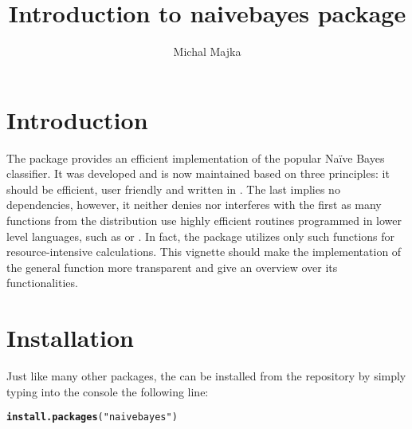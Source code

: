 \documentclass{article}\usepackage[]{graphicx}\usepackage[]{color}
\makeatletter
\newcommand{\hlstr}[1]{\textcolor[rgb]{0.192,0.494,0.8}{#1}}%
\newcommand{\hlstd}[1]{\textcolor[rgb]{0.345,0.345,0.345}{#1}}%
\newcommand{\hlkwd}[1]{\textcolor[rgb]{0.737,0.353,0.396}{\textbf{#1}}}%
\newenvironment{kframe}{%
 \def\at@end@of@kframe{}%
 \ifinner\ifhmode%
  \def\at@end@of@kframe{\end{minipage}}%
  \begin{minipage}{\columnwidth}%
 \fi\fi%
 \def\FrameCommand##1{\hskip\@totalleftmargin \hskip-\fboxsep
 \colorbox{shadecolor}{##1}\hskip-\fboxsep
     \hskip-\linewidth \hskip-\@totalleftmargin \hskip\columnwidth}%
 \MakeFramed {\advance\hsize-\width
   \@totalleftmargin\z@ \linewidth\hsize
   \@setminipage}}%
 {\par\unskip\endMakeFramed%
 \at@end@of@kframe}
\newenvironment{knitrout}{}{} %
\makeatother
\begin{document}
\title{Introduction to naivebayes package}

\author{Michal Majka}

\onehalfspace



\maketitle

\section{Introduction}

The \textcolor{darkgreen}{{}} package provides an efficient implementation of the popular Na\"ive Bayes classifier. It was developed and is now maintained based on three principles: it should be efficient, user friendly and written in \textcolor{darkgreen}{{}}. The last implies no dependencies, however, it neither denies nor interferes with the first as many functions from the \textcolor{darkgreen}{{}} distribution use highly efficient routines programmed in lower level languages, such as \textcolor{darkgreen}{{}} or \textcolor{darkgreen}{{}}. In fact, the \textcolor{darkgreen}{{}} package utilizes only such functions for resource-intensive calculations. This vignette should make the implementation of the general \textcolor{darkgreen}{{}} function more transparent and give an overview over its functionalities.


\section{Installation}

Just like many other \textcolor{darkgreen}{{}} packages, the \textcolor{darkgreen}{{}} can be installed from the \textcolor{darkgreen}{{}} repository by simply typing into the console the following line:

\begin{knitrout}
\color{fgcolor}\begin{kframe}
\begin{alltt}
\hlkwd{install.packages}\hlstd{(}\hlstr{"naivebayes"}\hlstd{)}
\end{alltt}
\end{kframe}
\end{knitrout}
\end{document}
